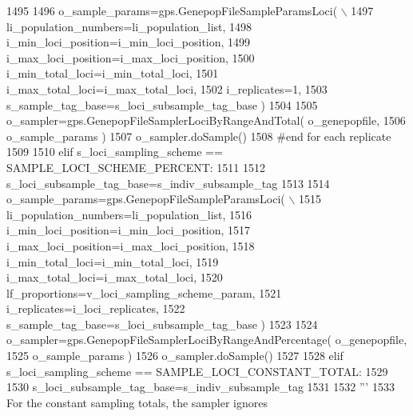 \begin{DoxyCode}
1495 
1496                 o\_sample\_params=gps.GenepopFileSampleParamsLoci( \(\backslash\)
1497                                             li\_population\_numbers=li\_population\_list,
1498                                             i\_min\_loci\_position=i\_min\_loci\_position,
1499                                             i\_max\_loci\_position=i\_max\_loci\_position,
1500                                             i\_min\_total\_loci=i\_min\_total\_loci,
1501                                             i\_max\_total\_loci=i\_max\_total\_loci,
1502                                             i\_replicates=1,
1503                                             s\_sample\_tag\_base=s\_loci\_subsample\_tag\_base )
1504 
1505                 o\_sampler=gps.GenepopFileSamplerLociByRangeAndTotal( o\_genepopfile,
1506                                                                         o\_sample\_params )
1507                 o\_sampler.doSample()
1508             \textcolor{comment}{#end for each replicate}
1509 
1510         \textcolor{keywordflow}{elif} s\_loci\_sampling\_scheme == SAMPLE\_LOCI\_SCHEME\_PERCENT:
1511 
1512             s\_loci\_subsample\_tag\_base=s\_indiv\_subsample\_tag
1513 
1514             o\_sample\_params=gps.GenepopFileSampleParamsLoci( \(\backslash\)
1515                                                     li\_population\_numbers=li\_population\_list,
1516                                                     i\_min\_loci\_position=i\_min\_loci\_position,
1517                                                     i\_max\_loci\_position=i\_max\_loci\_position,
1518                                                     i\_min\_total\_loci=i\_min\_total\_loci,
1519                                                     i\_max\_total\_loci=i\_max\_total\_loci,
1520                                                     lf\_proportions=v\_loci\_sampling\_scheme\_param,
1521                                                     i\_replicates=i\_loci\_replicates,
1522                                                     s\_sample\_tag\_base=s\_loci\_subsample\_tag\_base )
1523 
1524             o\_sampler=gps.GenepopFileSamplerLociByRangeAndPercentage( o\_genepopfile,
1525                                                                     o\_sample\_params )
1526             o\_sampler.doSample()
1527 
1528         \textcolor{keywordflow}{elif} s\_loci\_sampling\_scheme == SAMPLE\_LOCI\_CONSTANT\_TOTAL:
1529 
1530             s\_loci\_subsample\_tag\_base=s\_indiv\_subsample\_tag
1531         
1532             \textcolor{stringliteral}{'''}
1533 \textcolor{stringliteral}{            For the constant sampling totals, the sampler ignores }

\end{DoxyCode}
